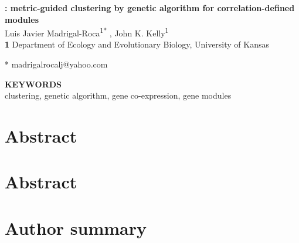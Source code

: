 \documentclass[10pt,letterpaper]{article}
\begin{document}
\vspace*{0.2in}

\begin{flushleft}
{\Large
\textbf{\tool{}: metric-guided clustering by genetic algorithm for correlation-defined modules}
}
\newline
\\
Luis Javier Madrigal-Roca\textsuperscript{1*} ,
John K. Kelly\textsuperscript{1}
\\
\bigskip
\textbf{1} Department of Ecology and Evolutionary Biology, University of Kansas
\\
\bigskip

* madrigalrocalj@yahoo.com

\bigskip
\textbf{KEYWORDS}
\\
clustering, genetic algorithm, gene co-expression, gene modules

\end{flushleft}

\section*{Abstract}

\section*{Abstract}


\section*{Author summary}


\clearpage
{}
\linenumbers



\nolinenumbers


\end{document}
